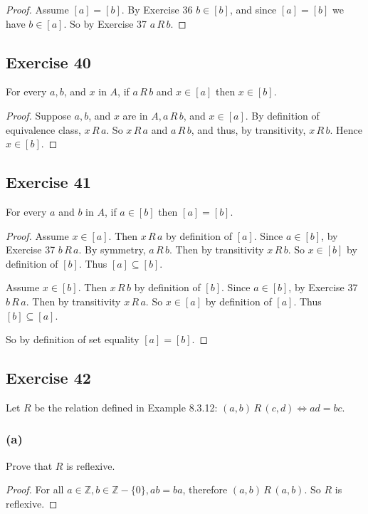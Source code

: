 \documentclass[14pt]{extarticle}
\newcommand{\Z}{\mathbb{Z}}
\begin{document}
\begin{proof}
Assume \([a] = [b]\). By Exercise 36 \(b \in [b]\), and since \([a] = [b]\) we have \(b \in [a]\). So by Exercise 
37 \(a \,R\, b\).
\end{proof}

\subsection{Exercise 40}
For every \(a, b\), and \(x\) in \(A\), if \(a \,R\, b\) and \(x \in [a]\) then \(x \in [b]\).

\begin{proof}
Suppose \(a, b\), and \(x\) are in \(A, a \,R\, b\), and \(x \in [a]\). By definition of equivalence class, 
\(x \,R\, a\). So \(x \,R\, a\) and \(a \,R\, b\), and thus, by transitivity, \(x \,R\, b\). Hence \(x \in [b]\).
\end{proof}

\subsection{Exercise 41}
For every $a$ and $b$ in $A$, if \(a \in [b]\) then \([a] = [b]\).

\begin{proof}
Assume \(x \in [a]\). Then \(x \,R\, a\) by definition of \([a]\). Since \(a \in [b]\), by Exercise 37 \(b \,R\, a\).
By symmetry, \(a \,R\, b\). Then by transitivity \(x \,R\, b\). So \(x \in [b]\) by definition of \([b]\). Thus 
\([a] \subseteq [b]\).

Assume \(x \in [b]\). Then \(x \,R\, b\) by definition of \([b]\). Since \(a \in [b]\), by Exercise 37 \(b \,R\, a\).
Then by transitivity \(x \,R\, a\). So \(x \in [a]\) by definition of \([a]\). Thus \([b] \subseteq [a]\).

So by definition of set equality \([a] = [b]\).
\end{proof}

\subsection{Exercise 42}
Let $R$ be the relation defined in Example 8.3.12: \((a,b) \,R\, (c,d) \iff ad = bc\).

\subsubsection{(a)}
Prove that $R$ is reflexive.

\begin{proof}
For all \(a \in \Z, b \in \Z - \{0\}, ab = ba\), therefore \((a,b) \,R\, (a,b)\). So $R$ is reflexive.
\end{proof}
\end{document}

